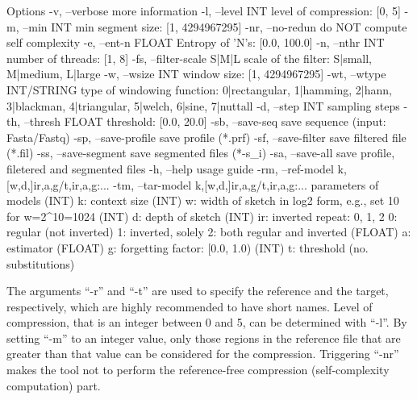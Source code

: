\begin{code}[style=bash]
  Options                                                      
  -v,  --verbose             more information                  
  -l,  --level INT           level of compression: [0, 5]      
  -m,  --min   INT           min segment size: [1, 4294967295] 
  -nr, --no-redun            do NOT compute self complexity    
  -e,  --ent-n FLOAT         Entropy of 'N's: [0.0, 100.0]     
  -n,  --nthr  INT           number of threads: [1, 8]         
  -fs, --filter-scale S|M|L  scale of the filter:              
                             {S|small, M|medium, L|large}      
  -w,  --wsize INT           window size: [1, 4294967295]      
  -wt, --wtype INT/STRING    type of windowing function:       
                             {0|rectangular, 1|hamming, 2|hann,
                             3|blackman, 4|triangular, 5|welch,
                             6|sine, 7|nuttall}                
  -d,  --step   INT          sampling steps                    
  -th, --thresh FLOAT        threshold: [0.0, 20.0]        
  -sb, --save-seq            save sequence (input: Fasta/Fastq)
  -sp, --save-profile        save profile (*.prf)              
  -sf, --save-filter         save filtered file (*.fil)
  -ss, --save-segment        save segmented files (*-s_i)      
  -sa, --save-all            save profile, filetered and       
                             segmented files                   
  -h,  --help                usage guide                       
  -rm, --ref-model  k,[w,d,]ir,a,g/t,ir,a,g:...                
  -tm, --tar-model  k,[w,d,]ir,a,g/t,ir,a,g:...                
                             parameters of models              
                       (INT) k:  context size                  
                       (INT) w:  width of sketch in log2 form, 
                                 e.g., set 10 for w=2^10=1024  
                       (INT) d:  depth of sketch               
                       (INT) ir: inverted repeat: {0, 1, 2}    
                                 0: regular (not inverted)     
                                 1: inverted, solely           
                                 2: both regular and inverted  
                     (FLOAT) a:  estimator                     
                     (FLOAT) g:  forgetting factor: [0.0, 1.0) 
                       (INT) t:  threshold (no. substitutions)
\end{code}

The arguments ``-r'' and ``-t'' are used to specify the reference and the target, respectively, which are highly recommended to have short names. Level of compression, that is an integer between 0 and 5, can be determined with ``-l''. By setting ``-m'' to an integer value, only those regions in the reference file that are greater than that value can be considered for the compression. Triggering ``-nr'' makes the tool not to perform the reference-free compression (self-complexity computation) part. 


